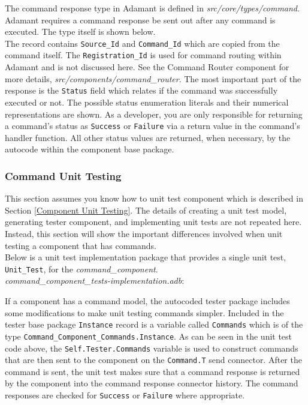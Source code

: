 The command response type in Adamant is defined in \textit{src/core/types/command}. Adamant requires a command response be sent out after any command is executed. The type itself is shown below. \\



The record contains \texttt{Source\_Id} and \texttt{Command\_Id} which are copied from the command itself. The \texttt{Registration\_Id} is used for command routing within Adamant and is not discussed here. See the Command Router component for more details, \textit{src/components/command\_router}. The most important part of the response is the \texttt{Status} field which relates if the command was successfully executed or not. The possible status enumeration literals and their numerical representations are shown. As a developer, you are only responsible for returning a command's status as \texttt{Success} or \texttt{Failure} via a return value in the command's handler function. All other status values are returned, when necessary, by the autocode within the component base package.

\subsubsection{Command Unit Testing} \label{Command Unit Testing}

This section assumes you know how to unit test component which is described in Section \ref{Component Unit Testing}. The details of creating a unit test model, generating tester component, and implementing unit tests are not repeated here. Instead, this section will show the important differences involved when unit testing a component that has commands. \\

Below is a unit test implementation package that provides a single unit test, \texttt{Unit\_Test}, for the \textit{command\_component}. \\

\textit{command\_component\_tests-implementation.adb}:

If a component has a command model, the autocoded tester package includes some modifications to make unit testing commands simpler. Included in the tester base package \texttt{Instance} record is a variable called \texttt{Commands} which is of the type \texttt{Command\_Component\_Commands.Instance}. As can be seen in the unit test code above, the \texttt{Self.Tester.Commands} variable is used to construct commands that are then sent to the component on the \texttt{Command.T} send connector. After the command is sent, the unit test makes sure that a command response is returned by the component into the command response connector history. The command responses are checked for \texttt{Success} or \texttt{Failure} where appropriate. \\

